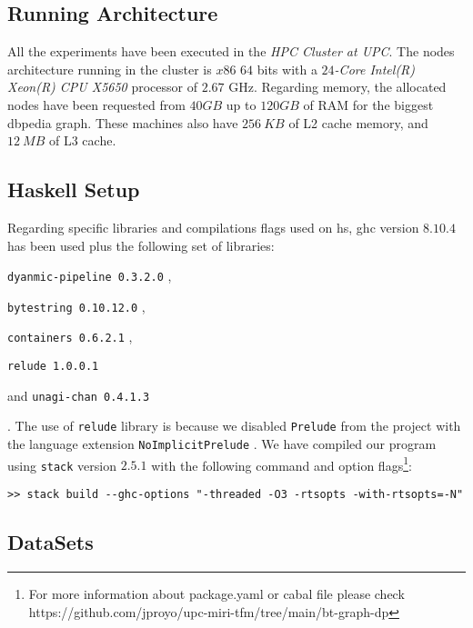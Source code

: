 \subsection{Running Architecture}
All the experiments have been executed in the \emph{HPC Cluster at UPC}. The nodes architecture running in the cluster is $x86$ $64$ bits with a \textit{$24$-Core Intel(R) Xeon(R) CPU X5650} processor of $2.67$ GHz. 
Regarding memory, the allocated nodes have been requested from $40 GB$ up to $120 GB$ of RAM for the biggest \acrshort{dbpedia} graph. These machines also have $256\ KB$ of L2 cache memory, and $12\ MB$ of L3 cache.

\subsection{Haskell Setup}
Regarding specific libraries and compilations flags used on \acrshort{hs}, \acrshort{ghc} version $8.10.4$ has been used plus the following set of libraries: 
\begin{inparaenum}[]
      \item \texttt{dyanmic-pipeline 0.3.2.0} \cite{dynamic-pipeline},
      \item \texttt{bytestring 0.10.12.0} \cite{bytestring},
      \item \texttt{containers 0.6.2.1} \cite{containers}, 
      \item \texttt{relude 1.0.0.1} \cite{relude}
      \item and \texttt{unagi-chan 0.4.1.3} \cite{unagi} 
  \end{inparaenum}. The use of \texttt{relude} library is because we disabled 
\texttt{Prelude} from the project with the language extension \texttt{NoImplicitPrelude} \cite{extensions}. 
We have compiled our program using \texttt{stack} version $2.5.1$ \cite{stack} with the following command and option flags\footnote{For more information about package.yaml or cabal file please check https://github.com/jproyo/upc-miri-tfm/tree/main/bt-graph-dp}:

\begin{verbatim}
>> stack build --ghc-options "-threaded -O3 -rtsopts -with-rtsopts=-N"
\end{verbatim}

\subsection{DataSets}\label{data:set}

